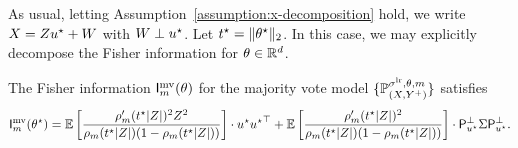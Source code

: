 As usual, letting Assumption~\ref{assumption:x-decomposition} hold, we write
$X = Z u^\star + W$ with $ W \perp u^\star$. Let $t^\star = \|{\theta^\star}\|_2$.
In this case, we may explicitly decompose the Fisher information
for $\theta \in \mathbb{R}^d$.

\begin{lemma}
  \label{lem:fisher-information-decomposition}
  The Fisher information $\mathsf{I}^{\textup{mv}}_m(\theta)$ for the majority vote
  model $\{\mathbb{P}_{(X,Y^+)}^{\sigma^{\textup{lr}}, \theta, m}\}$ satisfies
  \begin{align*}
    \mathsf{I}^{\textup{mv}}_m(\theta^\star) = \mathbb{E} \left[{\frac{\rho_m'(t^\star|Z|)^2
        Z^2}{\rho_m(t^\star|Z|) ( 1 - \rho_m(t^\star|Z|))}}\right] \cdot u^\star
             {u^\star}^\top + \mathbb{E} \left[{\frac{\rho_m'(t^\star|Z|)^2
               }{\rho_m(t^\star|Z|) ( 1 - \rho_m(t^\star|Z|))}}\right] \cdot
             \mathsf{P}_{u^\star}^\perp \Sigma \mathsf{P}_{u^\star}^\perp .
  \end{align*}
\end{lemma}

